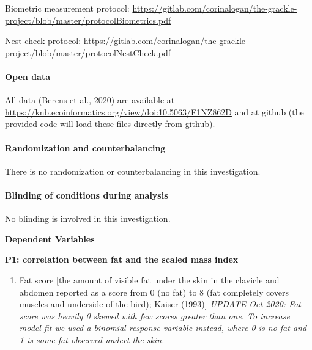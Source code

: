 \documentclass[
]{article}
\providecommand{\tightlist}{%
  \setlength{\itemsep}{0pt}\setlength{\parskip}{0pt}}
\begin{document}
Biometric measurement protocol:
\url{https://gitlab.com/corinalogan/the-grackle-project/blob/master/protocolBiometrics.pdf}

Nest check protocol:
\url{https://gitlab.com/corinalogan/the-grackle-project/blob/master/protocolNestCheck.pdf}

\hypertarget{open-data}{%
\paragraph{\texorpdfstring{\textbf{Open
data}}{Open data}}\label{open-data}}

All data (Berens et al., 2020) are available at
\url{https://knb.ecoinformatics.org/view/doi:10.5063/F1NZ862D} and at
github (the provided code will load these files directly from github).

\hypertarget{randomization-and-counterbalancing}{%
\paragraph{\texorpdfstring{\textbf{Randomization and
counterbalancing}}{Randomization and counterbalancing}}\label{randomization-and-counterbalancing}}

There is no randomization or counterbalancing in this investigation.

\hypertarget{blinding-of-conditions-during-analysis}{%
\paragraph{\texorpdfstring{\textbf{Blinding of conditions during
analysis}}{Blinding of conditions during analysis}}\label{blinding-of-conditions-during-analysis}}

No blinding is involved in this investigation.

\textbf{Dependent Variables}

\textbf{P1: correlation between fat and the scaled mass index}

\begin{enumerate}
\def\labelenumi{\arabic{enumi})}
\tightlist
\item
  Fat score {[}the amount of visible fat under the skin in the clavicle
  and abdomen reported as a score from 0 (no fat) to 8 (fat completely
  covers muscles and underside of the bird); Kaiser (1993){]}
  \emph{UPDATE Oct 2020: Fat score was heavily 0 skewed with few scores
  greater than one. To increase model fit we used a binomial response
  variable instead, where 0 is no fat and 1 is some fat observed undert
  the skin.}
\end{enumerate}
\end{document}
